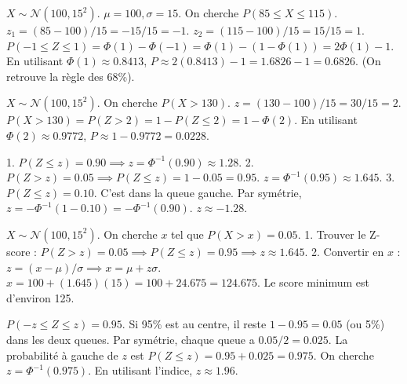 \begin{correctionbox}
$X \sim \mathcal{N}(100, 15^2)$. $\mu=100, \sigma=15$.
On cherche $P(85 \le X \le 115)$.
$z_1 = (85 - 100) / 15 = -15 / 15 = -1$.
$z_2 = (115 - 100) / 15 = 15 / 15 = 1$.
$P(-1 \le Z \le 1) = \Phi(1) - \Phi(-1) = \Phi(1) - (1 - \Phi(1)) = 2\Phi(1) - 1$.
En utilisant $\Phi(1) \approx 0.8413$, $P \approx 2(0.8413) - 1 = 1.6826 - 1 = 0.6826$.
(On retrouve la règle des 68\%).
\end{correctionbox}

\begin{correctionbox}
$X \sim \mathcal{N}(100, 15^2)$.
On cherche $P(X > 130)$.
$z = (130 - 100) / 15 = 30 / 15 = 2$.
$P(X > 130) = P(Z > 2) = 1 - P(Z \le 2) = 1 - \Phi(2)$.
En utilisant $\Phi(2) \approx 0.9772$, $P \approx 1 - 0.9772 = 0.0228$.
\end{correctionbox}


\begin{correctionbox}
1.  $P(Z \le z) = 0.90 \implies z = \Phi^{-1}(0.90) \approx 1.28$.
2.  $P(Z > z) = 0.05 \implies P(Z \le z) = 1 - 0.05 = 0.95$.
    $z = \Phi^{-1}(0.95) \approx 1.645$.
3.  $P(Z \le z) = 0.10$. C'est dans la queue gauche. Par symétrie, $z = - \Phi^{-1}(1 - 0.10) = - \Phi^{-1}(0.90)$.
    $z \approx -1.28$.
\end{correctionbox}

\begin{correctionbox}
$X \sim \mathcal{N}(100, 15^2)$. On cherche $x$ tel que $P(X > x) = 0.05$.
1.  Trouver le Z-score : $P(Z > z) = 0.05 \implies P(Z \le z) = 0.95 \implies z \approx 1.645$.
2.  Convertir en $x$ : $z = (x-\mu)/\sigma \implies x = \mu + z\sigma$.
    $x = 100 + (1.645)(15) = 100 + 24.675 = 124.675$.
    Le score minimum est d'environ 125.
\end{correctionbox}

\begin{correctionbox}
$P(-z \le Z \le z) = 0.95$.
Si 95\% est au centre, il reste $1 - 0.95 = 0.05$ (ou 5\%) dans les deux queues.
Par symétrie, chaque queue a $0.05 / 2 = 0.025$.
La probabilité à gauche de $z$ est $P(Z \le z) = 0.95 + 0.025 = 0.975$.
On cherche $z = \Phi^{-1}(0.975)$.
En utilisant l'indice, $z \approx 1.96$.
\end{correctionbox}

